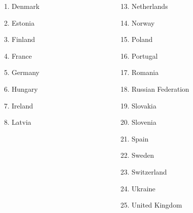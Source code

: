 \documentclass{beamer}
\begin{document}
\begin{frame}
\begin{columns}[T]
\begin{column}{4.5cm}
\begin{columns}
\begin{column}{2cm}
\begin{scriptsize}
\begin{enumerate}
						\item Denmark 	
						\item Estonia 	
						\item Finland 	
						\item France 	
						\item Germany 	
						\item Hungary 	
						\item Ireland
						\item Latvia													
					\end{enumerate}\end{scriptsize}
				\end{column}
				\begin{column}{2.5cm}
					\begin{scriptsize}\begin{enumerate}		
						\item[13.] Netherlands			
						\item[14.] Norway 	
						\item[15.] Poland 	
						\item[16.] Portugal 	
						\item[17.] Romania 	
						\item[18.] Russian Federation 	
						\item[19.] Slovakia 	
						\item[20.] Slovenia 	
						\item[21.] Spain 	
						\item[22.] Sweden 	
						\item[23.] Switzerland 	
						\item[24.] Ukraine
						\item[25.] United Kingdom 
					\end{enumerate}\end{scriptsize}
				\end{column}
			\end{columns}
		\end{column}
	\end{columns}
\end{frame}
\end{document}
